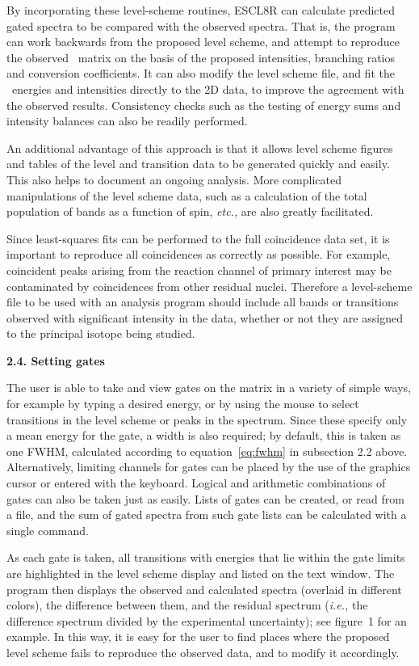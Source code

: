 By incorporating these level-scheme routines, ESCL8R can calculate predicted
gated spectra to be compared with the observed spectra. That is, the program
can work backwards from the proposed level scheme, and attempt to reproduce the
observed \ghg\ matrix on the basis of the proposed intensities, branching
ratios and conversion coefficients. It can also modify the level scheme file,
and fit the \ghray\ energies and intensities directly to the 2D data, to
improve the agreement with the observed results. Consistency checks such as the
testing of energy sums and intensity balances can also be readily performed.

An additional advantage of this approach is that it allows level scheme figures
and tables of the level and transition data to be generated quickly and easily.
This also helps to document an ongoing analysis. More complicated manipulations
of the level scheme data, such as a calculation of the total population of
bands as a function of spin, {\em etc.,} are also greatly facilitated.

Since least-squares fits can be performed to the full coincidence data set, it
is important to reproduce all coincidences as correctly as possible. For
example, coincident peaks arising from the reaction channel of primary interest
may be contaminated by coincidences from other residual nuclei. Therefore a
level-scheme file to be used with an analysis program should include all bands
or transitions observed with significant intensity in the data, whether or not
they are assigned to the principal isotope being studied.

\noindent
{\bf 2.4. Setting gates}

The user is able to take and view gates on the matrix in a variety of simple
ways, for example by typing a desired energy, or by using the mouse to select
transitions in the level scheme or peaks in the spectrum. Since these specify
only a mean energy for the gate, a width is also required; by default, this is
taken as one FWHM, calculated according to equation~\ref{eq:fwhm} in subsection
2.2 above. Alternatively, limiting channels for gates can be placed by the use
of the graphics cursor or entered with the keyboard. Logical and arithmetic
combinations of gates can also be taken just as easily. Lists of gates can be
created, or read from a file, and the sum of gated spectra from such gate lists
can be calculated with a single command.

As each gate is taken, all transitions with energies that lie within the gate
limits are highlighted in the level scheme display and listed on the text
window. The program then displays the observed and calculated spectra (overlaid
in different colors), the difference between them, and the residual spectrum
({\em i.e.,} the difference spectrum divided by the experimental uncertainty);
see figure~1 for an example. In this way, it is easy for the user to find
places where the proposed level scheme fails to reproduce the observed data,
and to modify it accordingly.

